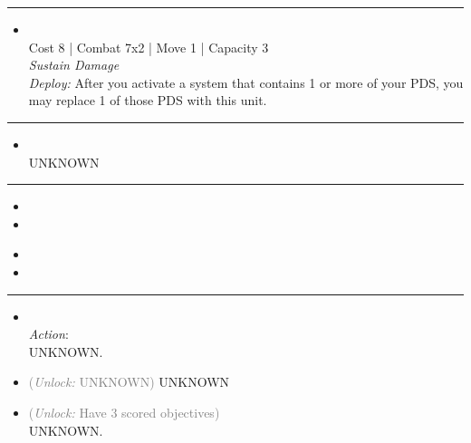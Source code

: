 \begin{multicols}{2}
\vspace{-10pt}\rule{\hsize}{0.4pt}\vspace{5pt}


\begin{itemize}
\item {}\\
Cost 8 | Combat 7x2 | Move 1 | Capacity 3 \\
\emph{Sustain Damage}\\
\emph{Deploy:} After you activate a system that contains 1 or more of your PDS, you may replace 1 of those PDS with this unit.
\end{itemize}

\vspace{-10pt}\rule{\hsize}{0.4pt}\vspace{5pt}


\begin{itemize}
\item {} 
\\
UNKNOWN
\end{itemize}

\vspace{-10pt}\rule{\hsize}{0.4pt}\vspace{5pt}


\begin{itemize}
\item \helTitanI
\item \saturnEngineI
\end{itemize}

\columnbreak
{}

\begin{itemize}
\item \helTitanII
\item \saturnEngineII
\end{itemize}

\vspace{-10pt}\rule{\hsize}{0.4pt}\vspace{5pt}


\begin{itemize}
\item {}\\
\emph{Action}:\\
UNKNOWN.
\item {} \textcolor{gray}{(\emph{Unlock:} UNKNOWN)}
UNKNOWN
\item {} \textcolor{gray}{(\emph{Unlock:} Have 3 scored objectives)}\\
UNKNOWN.
\end{itemize}


\end{multicols}
